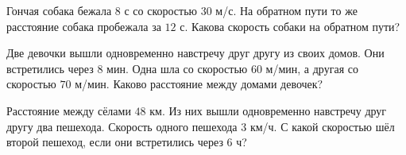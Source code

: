 \begin{homework}[number=2]
	\begin{listofex}
		\item Гончая собака бежала \( 8 \) с со скоростью \( 30 \) м/с. На обратном пути то же расстояние собака пробежала за \( 12 \) с. Какова скорость собаки на обратном пути?
		\item Две девочки вышли одновременно навстречу друг другу из своих домов. Они встретились через \( 8 \) мин. Одна шла со скоростью \( 60 \) м/мин, а другая со скоростью \( 70 \) м/мин. Каково расстояние между домами девочек?
		\item Расстояние между сёлами \( 48 \) км. Из них вышли одновременно навстречу друг другу два пешехода. Скорость одного пешехода \( 3 \) км/ч. С какой скоростью шёл второй пешеход, если они встретились через \( 6 \) ч?
	\end{listofex}
\end{homework}

